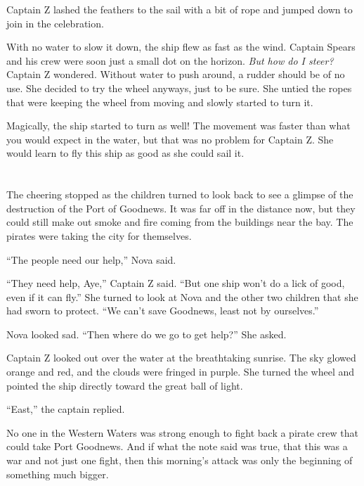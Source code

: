 \documentclass[12pt]{extbook}
\begin{document}
  Captain Z lashed the feathers to the sail with a bit of rope and jumped
  down to join in the celebration.
  
  With no water to slow it down, the ship flew as fast as the wind.
  Captain Spears and his crew were soon just a small dot on the horizon.
  \emph{But how do I steer?} Captain Z wondered. Without water to push
  around, a rudder should be of no use. She decided to try the wheel
  anyways, just to be sure. She untied the ropes that were keeping the
  wheel from moving and slowly started to turn it.
  
  Magically, the ship started to turn as well! The movement was faster
  than what you would expect in the water, but that was no problem for
  Captain Z. She would learn to fly this ship as good as she could sail
  it.
  
  \section{}\label{section-40}
  
  The cheering stopped as the children turned to look back to see a
  glimpse of the destruction of the Port of Goodnews. It was far off in
  the distance now, but they could still make out smoke and fire coming
  from the buildings near the bay. The pirates were taking the city for
  themselves.
  
  \enquote{The people need our help,} Nova said.
  
  \enquote{They need help, Aye,} Captain Z said. \enquote{But one ship
  won't do a lick of good, even if it can fly.} She turned to look at Nova
  and the other two children that she had sworn to protect. \enquote{We
  can't save Goodnews, least not by ourselves.}
  
  Nova looked sad. \enquote{Then where do we go to get help?} She asked.
  
  Captain Z looked out over the water at the breathtaking sunrise. The sky
  glowed orange and red, and the clouds were fringed in purple. She turned
  the wheel and pointed the ship directly toward the great ball of light.
  
  \enquote{East,} the captain replied.
  
  No one in the Western Waters was strong enough to fight back a pirate
  crew that could take Port Goodnews. And if what the note said was true,
  that this was a war and not just one fight, then this morning's attack
  was only the beginning of something much bigger.
  
\end{document}
